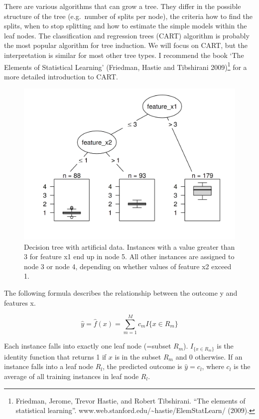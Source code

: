 \documentclass[12pt,]{krantz}
\begin{document}
There are various algorithms that can grow a tree. They differ in the
possible structure of the tree (e.g.~number of splits per node), the
criteria how to find the splits, when to stop splitting and how to
estimate the simple models within the leaf nodes. The classification and
regression trees (CART) algorithm is probably the most popular algorithm
for tree induction. We will focus on CART, but the interpretation is
similar for most other tree types. I recommend the book `The Elements of
Statistical Learning' (Friedman, Hastie and Tibshirani 2009)\footnote{Friedman,
  Jerome, Trevor Hastie, and Robert Tibshirani. ``The elements of
  statistical learning''.
  www.web.stanford.edu/\textasciitilde{}hastie/ElemStatLearn/ (2009).}
for a more detailed introduction to CART.

\begin{figure}

{\centering \includegraphics[width=\textwidth]{images/tree-artificial-1} 

}

\caption{Decision tree with artificial data. Instances with a value greater than 3 for feature x1 end up in node 5. All other instances are assigned to node 3 or node 4, depending on whether values of feature x2  exceed 1.}\label{fig:tree-artificial}
\end{figure}

The following formula describes the relationship between the outcome y
and features x.

\[\hat{y}=\hat{f}(x)=\sum_{m=1}^Mc_m{}I\{x\in{}R_m\}\]

Each instance falls into exactly one leaf node (=subset \(R_m\)).
\(I_{\{x\in{}R_m\}}\) is the identity function that returns 1 if \(x\)
is in the subset \(R_m\) and 0 otherwise. If an instance falls into a
leaf node \(R_l\), the predicted outcome is \(\hat{y}=c_l\), where
\(c_l\) is the average of all training instances in leaf node \(R_l\).
\end{document}
